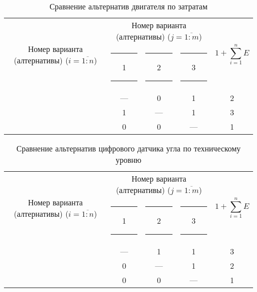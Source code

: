\begin{table}[H]
    \centering
    \begin{tabular}{|c|c|c|c|c|}
        \hline
        \multirow{2}{2.4cm}[-0.5pc]{
            \centering
            Номер варианта (алтернативы) ($i = \overline{1:n}$)
        } &
        \multicolumn{3}{c|}{
            \parbox[t]{2.4cm}{
                \centering
                Номер варианта (алтернативы) ($j = \overline{1:m}$)
            }
        } &
        \multirow{2}{1.7cm}{
            \centering
            $$1 + \sum_{i=1}^n E$$
        } \\
        &
        \centering \rule{2pt}{0pt} 1 \rule{2pt}{0pt} &
        \centering \rule{2pt}{0pt} 2 \rule{2pt}{0pt} &
        \centering \rule{2pt}{0pt} 3 \rule{2pt}{0pt} & \\
        \hline \hline
        \centering{1} &---& 0 & 1 & 2 \\ \hline
        \centering{2} & 1 &---& 1 & 3 \\ \hline
        \centering{3} & 0 & 0 &---& 1 \\ \hline
    \end{tabular}
    \caption{Сравнение альтернатив двигателя по затратам}
    \label{tbl_motor_cost_lvl_comparison}
\end{table}

\begin{table}[H]
    \centering
    \begin{tabular}{|c|c|c|c|c|}
        \hline
        \multirow{2}{2.4cm}[-0.5pc]{
            \centering
            Номер варианта (алтернативы) ($i = \overline{1:n}$)
        } &
        \multicolumn{3}{c|}{
            \parbox[t]{2.4cm}{
                \centering
                Номер варианта (алтернативы) ($j = \overline{1:m}$)
            }
        } &
        \multirow{2}{1.7cm}{
            \centering
            $$1 + \sum_{i=1}^n E$$
        } \\
        &
        \centering \rule{2pt}{0pt} 1 \rule{2pt}{0pt} &
        \centering \rule{2pt}{0pt} 2 \rule{2pt}{0pt} &
        \centering \rule{2pt}{0pt} 3 \rule{2pt}{0pt} & \\
        \hline \hline
        \centering{1} &---& 1 & 1 & 3 \\ \hline
        \centering{2} & 0 &---& 1 & 2 \\ \hline
        \centering{3} & 0 & 0 &---& 1 \\ \hline
    \end{tabular}
    \caption{Сравнение альтернатив цифрового датчика угла по техническому уровню}
    \label{tbl_sensor_tech_lvl_comparison}
\end{table}

